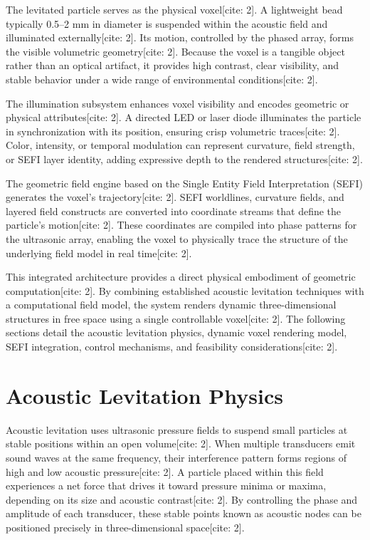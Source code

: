 \documentclass[10pt,twocolumn]{article}
\begin{document}
The levitated particle serves as the physical voxel[cite: 2]. A lightweight bead typically 0.5--2 mm in diameter is suspended within the acoustic field and illuminated externally[cite: 2]. Its motion, controlled by the phased array, forms the visible volumetric geometry[cite: 2]. Because the voxel is a tangible object rather than an optical artifact, it provides high contrast, clear visibility, and stable behavior under a wide range of environmental conditions[cite: 2].

The illumination subsystem enhances voxel visibility and encodes geometric or physical attributes[cite: 2]. A directed LED or laser diode illuminates the particle in synchronization with its position, ensuring crisp volumetric traces[cite: 2]. Color, intensity, or temporal modulation can represent curvature, field strength, or SEFI layer identity, adding expressive depth to the rendered structures[cite: 2].

The geometric field engine based on the Single Entity Field Interpretation (SEFI) generates the voxel's trajectory[cite: 2]. SEFI worldlines, curvature fields, and layered field constructs are converted into coordinate streams that define the particle's motion[cite: 2]. These coordinates are compiled into phase patterns for the ultrasonic array, enabling the voxel to physically trace the structure of the underlying field model in real time[cite: 2].

This integrated architecture provides a direct physical embodiment of geometric computation[cite: 2]. By combining established acoustic levitation techniques with a computational field model, the system renders dynamic three-dimensional structures in free space using a single controllable voxel[cite: 2]. The following sections detail the acoustic levitation physics, dynamic voxel rendering model, SEFI integration, control mechanisms, and feasibility considerations[cite: 2].
\section{Acoustic Levitation Physics}
Acoustic levitation uses ultrasonic pressure fields to suspend small particles at stable positions within an open volume[cite: 2]. When multiple transducers emit sound waves at the same frequency, their interference pattern forms regions of high and low acoustic pressure[cite: 2]. A particle placed within this field experiences a net force that drives it toward pressure minima or maxima, depending on its size and acoustic contrast[cite: 2]. By controlling the phase and amplitude of each transducer, these stable points known as acoustic nodes can be positioned precisely in three-dimensional space[cite: 2].
\end{document}

